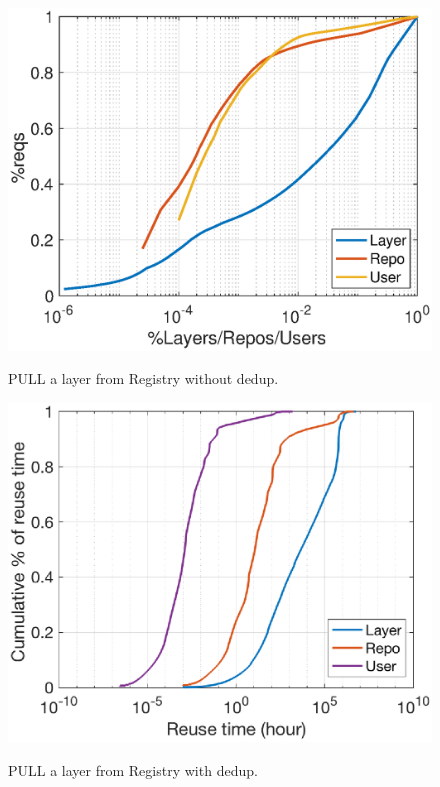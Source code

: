 \begin{figure}[t]
	\centering
		\begin{minipage}{0.225\textwidth}
			\centering
			\includegraphics[width=1\textwidth]{graphs/skewness_cdf.eps}
			\caption{PULL a layer from Registry without dedup.}
			\label{fig:ref_count}
		\end{minipage}
	\begin{minipage}{0.225\textwidth}
		\centering
		\includegraphics[width=1\textwidth]{graphs/reuse_time.eps}
		\caption{PULL a layer from Registry with dedup.}
		\vspace{-3pt}
		\label{fig:nodedup-vs-dedup}
	\end{minipage}
\end{figure}